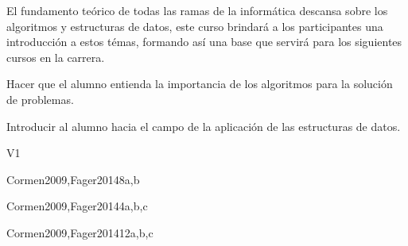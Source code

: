 \begin{syllabus}


\begin{justification}
El fundamento teórico de todas las ramas de la informática descansa sobre los algoritmos y estructuras de datos, este curso brindará a los participantes una introducción a estos témas, formando así una base que servirá para los siguientes cursos en la carrera.
\end{justification}

\begin{goals}
\item Hacer que el alumno entienda la importancia de los algoritmos para la solución de problemas.
\item Introducir al alumno hacia el campo de la aplicación de las estructuras de datos.
\end{goals}

\begin{outcomes}{V1}
   \item {}
   \item {}
   \item {}
   \item {}
   \item {}
   \item {}
   \item {}
\end{outcomes}

\begin{unit}{\SDFFundamentalDataStructures}{}{Cormen2009,Fager2014}{8}{a,b}
   \SDFFundamentalDataStructuresAllTopics
   \SDFFundamentalDataStructuresAllLearningOutcomes
\end{unit}

\begin{unit}{\SDFFundamentalProgrammingConcepts}{}{Cormen2009,Fager2014}{4}{a,b,c}
   \SDFFundamentalProgrammingConceptsAllTopics
   \SDFFundamentalProgrammingConceptsAllLearningOutcomes
\end{unit}

\begin{unit}{\ALAlgorithmicStrategies}{}{Cormen2009,Fager2014}{12}{a,b,c}
   \ALAlgorithmicStrategiesAllTopics
   \ALAlgorithmicStrategiesAllLearningOutcomes
\end{unit}


\end{syllabus}
